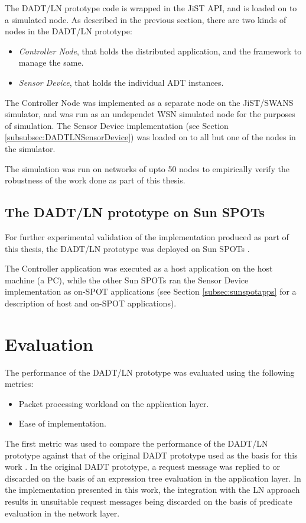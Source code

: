 The DADT/LN prototype code is wrapped in the JiST API, and is loaded on to a
simulated node. As described in the previous section, there are two kinds of
nodes in the DADT/LN prototype:

\begin{itemize}
  \item \emph{Controller Node}, that holds the distributed application, and the
  framework to manage the same.
  \item \emph{Sensor Device}, that holds the individual ADT instances. 
\end{itemize}

The Controller Node was implemented as a separate node on the JiST/SWANS
simulator, and was run as an undependet WSN simulated node for the purposes of
simulation. The Sensor Device implementation (see Section
\ref{subsubsec:DADTLNSensorDevice}) was loaded on to all but one of the nodes in
the simulator.

The simulation was run on networks of upto 50 nodes to empirically verify the
robustness of the work done as part of this thesis.

\subsection{The DADT/LN prototype on Sun SPOTs}

For further experimental validation of the implementation produced as part of 
this thesis,
the DADT/LN prototype was deployed on Sun SPOTs \cite{simon_squawk:2006}. 

The
Controller application was executed as a host application on the host machine (a
PC), while the other Sun SPOTs ran the Sensor Device implementation as on-SPOT
applications (see Section \ref{subsec:sunspotapps} for a description of host and on-SPOT
applications).

\section{Evaluation}

The performance of the DADT/LN prototype was evaluated using the following
metrics: 
\begin{itemize}
  \item Packet processing workload on the application layer.
  \item Ease of implementation. 
\end{itemize}

The first metric was used to compare the performance of the DADT/LN prototype
against that of the original DADT prototype used as the basis for this work
\cite{migliavacca_DADT:2006}. In the original DADT prototype, a request message
was replied to or discarded on the basis of an expression tree evaluation in the
application layer. In the implementation presented in this work, the integration
with the LN approach results in unsuitable request messages being discarded on
the basis of predicate evaluation in the network layer. 

